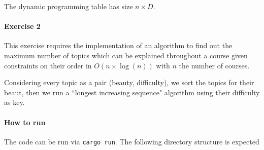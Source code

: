 \documentclass[12pt]{report}
\theoremstyle{definition}
\theoremstyle{definition}
\begin{document}
The dynamic programming table has size \(n \times D\).

\paragraph*{Exercise 2}
This exercise requires the implementation of an algorithm to find out the maximum
number of topics which can be explained throughout a course given constraints on
their order in \(O(n\times \log(n))\) with \(n\) the number of courses.

Considering every topic as a pair (beauty, difficulty), we sort the topics for
their beaut, then we run a ``longest increasing sequence" algorithm using their
difficulty as key.

\paragraph*{How to run}
The code can be run via \texttt{cargo run}. The following directory structure is
expected
\end{document}
